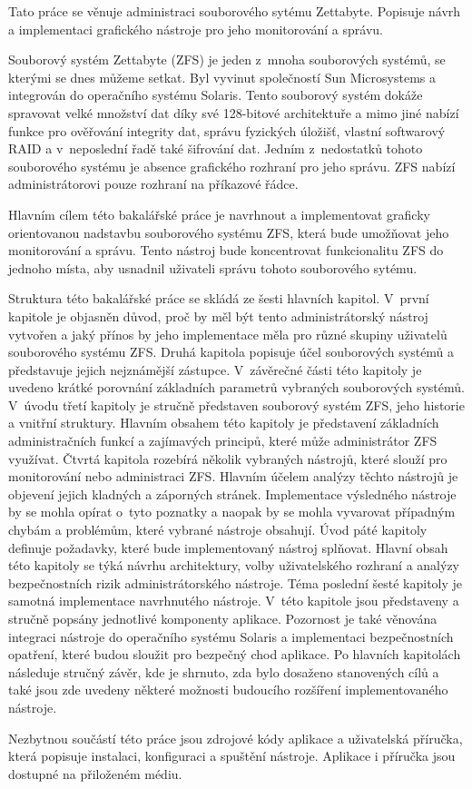 Tato práce se věnuje administraci souborového sytému Zettabyte. Popisuje návrh a implementaci grafického nástroje pro jeho monitorování a správu.

Souborový systém Zettabyte (ZFS) je jeden z~mnoha souborových systémů, se kterými se dnes můžeme setkat.
Byl vyvinut společností Sun Microsystems a integrován do operačního systému Solaris. Tento souborový systém dokáže spravovat velké množství dat díky své 128-bitové architektuře a mimo jiné nabízí funkce pro ověřování integrity dat, správu fyzických úložišť, vlastní softwarový RAID a v~neposlední
řadě také šifrování dat. Jedním z~nedostatků tohoto souborového systému je absence grafického rozhraní pro jeho správu. ZFS nabízí administrátorovi pouze rozhraní na příkazové řádce.

Hlavním cílem této bakalářské práce je navrhnout a implementovat graficky orientovanou nadstavbu souborového systému ZFS, která bude umožňovat jeho monitorování a správu. Tento nástroj bude koncentrovat funkcionalitu ZFS do jednoho místa, aby usnadnil uživateli správu tohoto souborového sytému.

Struktura této bakalářské práce se skládá ze šesti hlavních kapitol.
V~první kapitole je objasněn důvod, proč by měl být tento administrátorský nástroj vytvořen a jaký přínos by jeho implementace měla pro různé skupiny uživatelů souborového systému ZFS.
Druhá kapitola popisuje účel souborových systémů a představuje jejich nejznámější zástupce. V~závěrečné části této kapitoly je uvedeno krátké porovnání základních parametrů vybraných souborových systémů.
V~úvodu třetí kapitoly je stručně představen souborový systém ZFS, jeho historie a vnitřní struktury. Hlavním obsahem této kapitoly je představení základních administračních funkcí a zajímavých principů, které může administrátor ZFS využívat.
Čtvrtá kapitola rozebírá několik vybraných nástrojů, které slouží pro monitorování nebo administraci ZFS. Hlavním účelem analýzy těchto nástrojů je objevení jejich kladných a záporných stránek. Implementace výsledného nástroje by se mohla opírat o~tyto poznatky a naopak by se mohla vyvarovat případným chybám a problémům, které vybrané nástroje obsahují.
Úvod páté kapitoly definuje požadavky, které bude implementovaný nástroj splňovat. Hlavní obsah této kapitoly se týká návrhu architektury, volby uživatelského rozhraní a analýzy bezpečnostních rizik administrátorského nástroje.
Téma poslední šesté kapitoly je samotná implementace navrhnutého nástroje. V~této kapitole jsou představeny a stručně popsány jednotlivé komponenty aplikace. Pozornost je také věnována integraci nástroje do operačního systému Solaris a implementaci bezpečnostních opatření, které budou sloužit pro bezpečný chod aplikace.
Po hlavních kapitolách následuje stručný závěr, kde je shrnuto, zda bylo dosaženo stanovených cílů a také jsou zde uvedeny některé možnosti budoucího rozšíření implementovaného nástroje.

Nezbytnou součástí této práce jsou zdrojové kódy aplikace a uživatelská příručka, která popisuje instalaci, konfiguraci a spuštění nástroje. Aplikace i příručka jsou dostupné na přiloženém médiu.




